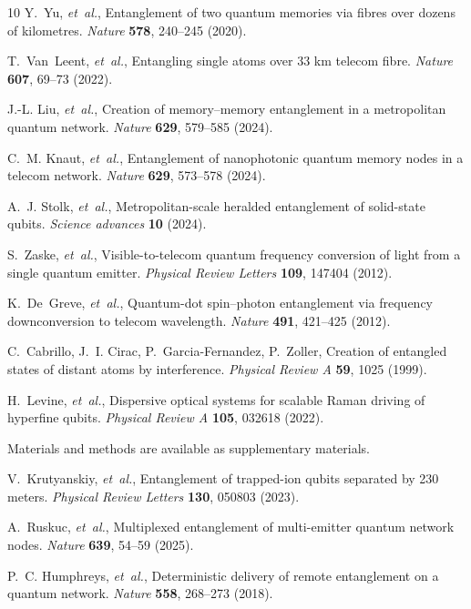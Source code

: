 \documentclass[aps,reprint,showpacs,superscriptaddress]{revtex4-2}
\begin{document}
\begin{thebibliography}{10}
Y.~Yu, \emph{et~al.}, Entanglement of two quantum memories via fibres over
  dozens of kilometres. \emph{Nature} \textbf{578}, 240--245 (2020).

T.~Van~Leent, \emph{et~al.}, Entangling single atoms over 33 km telecom fibre.
  \emph{Nature} \textbf{607}, 69--73 (2022).

J.-L. Liu, \emph{et~al.}, Creation of memory--memory entanglement in a
  metropolitan quantum network. \emph{Nature} \textbf{629}, 579--585 (2024).

C.~M. Knaut, \emph{et~al.}, Entanglement of nanophotonic quantum memory nodes
  in a telecom network. \emph{Nature} \textbf{629}, 573--578 (2024).

A.~J. Stolk, \emph{et~al.}, Metropolitan-scale heralded entanglement of
  solid-state qubits. \emph{Science advances} \textbf{10} (2024).

S.~Zaske, \emph{et~al.}, Visible-to-telecom quantum frequency conversion of
  light from a single quantum emitter. \emph{Physical Review Letters}
  \textbf{109}, 147404 (2012).

K.~De~Greve, \emph{et~al.}, Quantum-dot spin--photon entanglement via frequency
  downconversion to telecom wavelength. \emph{Nature} \textbf{491}, 421--425
  (2012).

C.~Cabrillo, J.~I. Cirac, P.~Garcia-Fernandez, P.~Zoller, Creation of entangled
  states of distant atoms by interference. \emph{Physical Review A}
  \textbf{59}, 1025 (1999).

H.~Levine, \emph{et~al.}, Dispersive optical systems for scalable Raman driving
  of hyperfine qubits. \emph{Physical Review A} \textbf{105}, 032618 (2022).

Materials and methods are available as supplementary materials.

V.~Krutyanskiy, \emph{et~al.}, Entanglement of trapped-ion qubits separated by
  230 meters. \emph{Physical Review Letters} \textbf{130}, 050803 (2023).

A.~Ruskuc, \emph{et~al.}, Multiplexed entanglement of multi-emitter quantum
  network nodes. \emph{Nature} \textbf{639}, 54--59 (2025).

P.~C. Humphreys, \emph{et~al.}, Deterministic delivery of remote entanglement
  on a quantum network. \emph{Nature} \textbf{558}, 268--273 (2018).


\end{thebibliography}
\end{document}
